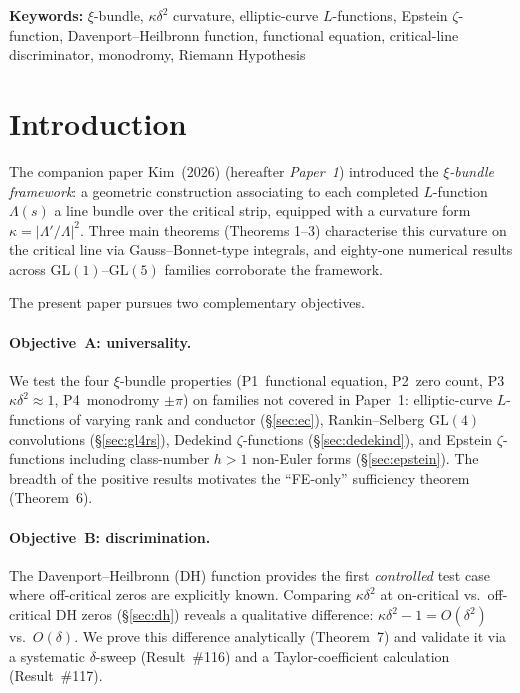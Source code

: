 \documentclass[11pt, a4paper]{article}
\theoremstyle{plain}
\theoremstyle{definition}
\begin{document}
\vspace{0.5em}
\noindent\textbf{Keywords:} $\xi$-bundle, $\kappa\delta^{2}$ curvature,
elliptic-curve $L$-functions, Epstein $\zeta$-function, Davenport--Heilbronn
function, functional equation, critical-line discriminator, monodromy,
Riemann Hypothesis

\tableofcontents
\newpage


\section{Introduction}
\label{sec:intro}

The companion paper Kim~(2026) (hereafter \textit{Paper~1}) introduced
the \emph{$\xi$-bundle framework}: a geometric construction associating
to each completed $L$-function $\Lambda(s)$ a line bundle over the
critical strip, equipped with a curvature form $\kappa = |\Lambda'/\Lambda|^{2}$.
Three main theorems (Theorems 1--3) characterise this curvature on the
critical line via Gauss--Bonnet-type integrals, and eighty-one numerical
results across $\mathrm{GL}(1)$--$\mathrm{GL}(5)$ families corroborate the framework.

The present paper pursues two complementary objectives.

\paragraph{Objective~A: universality.}
We test the four $\xi$-bundle properties (P1~functional equation,
P2~zero count, P3~$\kappa\delta^{2}\approx 1$, P4~monodromy $\pm\pi$)
on families not covered in Paper~1: elliptic-curve $L$-functions of
varying rank and conductor (\S\ref{sec:ec}), Rankin--Selberg
$\mathrm{GL}(4)$ convolutions (\S\ref{sec:gl4rs}), Dedekind
$\zeta$-functions (\S\ref{sec:dedekind}), and Epstein
$\zeta$-functions including class-number $h>1$ non-Euler forms
(\S\ref{sec:epstein}).  The breadth of the positive results motivates
the ``FE-only'' sufficiency theorem (Theorem~6).

\paragraph{Objective~B: discrimination.}
The Davenport--Heilbronn (DH) function provides the first
\emph{controlled} test case where off-critical zeros are explicitly
known.  Comparing $\kappa\delta^{2}$ at on-critical vs.\ off-critical
DH zeros (\S\ref{sec:dh}) reveals a qualitative difference:
$\kappa\delta^{2}-1 = O(\delta^{2})$ vs.\ $O(\delta)$.  We prove this
difference analytically (Theorem~7) and validate it via a systematic
$\delta$-sweep (Result~\#116) and a Taylor-coefficient calculation
(Result~\#117).
\end{document}
